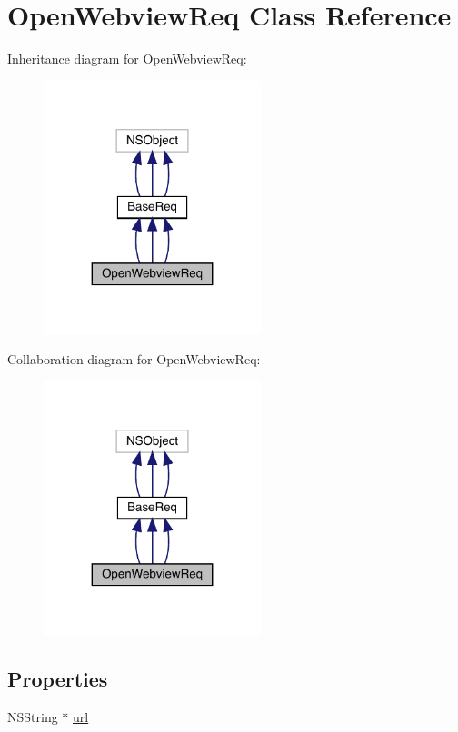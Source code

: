 \hypertarget{interface_open_webview_req}{}\section{Open\+Webview\+Req Class Reference}
\label{interface_open_webview_req}


Inheritance diagram for Open\+Webview\+Req\+:\nopagebreak
\begin{figure}[H]
\begin{center}
\leavevmode
\includegraphics[width=179pt]{interface_open_webview_req__inherit__graph}
\end{center}
\end{figure}


Collaboration diagram for Open\+Webview\+Req\+:\nopagebreak
\begin{figure}[H]
\begin{center}
\leavevmode
\includegraphics[width=179pt]{interface_open_webview_req__coll__graph}
\end{center}
\end{figure}
\subsection*{Properties}
\begin{DoxyCompactItemize}
\item 
N\+S\+String $\ast$ \mbox{\hyperlink{interface_open_webview_req_a2ea85dd46e252183bd14d075d41aa1b0}{url}}
\end{DoxyCompactItemize}


